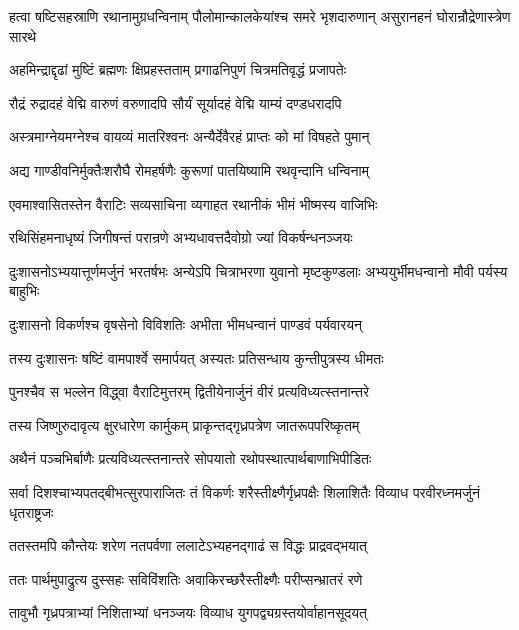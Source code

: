 \threelineshloka
{हत्वा षष्टिसहस्राणि रथानामुग्रधन्विनाम्}
{पौलोमान्कालकेयांश्च समरे भृशदारुणान्}
{असुरानहनं घोरान्रौद्रेणास्त्रेण सारथे}


\twolineshloka
{अहमिन्द्राद्दृढां मुष्टिं ब्रह्मणः क्षिप्रहस्तताम्}
{प्रगाढनिपुणं चित्रमतिवृद्धं प्रजापतेः}


\twolineshloka
{रौद्रं रुद्रादहं वेद्मि वारुणं वरुणादपि}
{सौर्यं सूर्यादहं वेद्मि याम्यं दण्डधरादपि}


\twolineshloka
{अस्त्रमाग्नेयमग्नेश्च वायव्यं मातरिश्वनः}
{अन्यैर्देवैरहं प्राप्तः को मां विषहते पुमान्}


\twolineshloka
{अद्य गाण्डीवनिर्मुक्तैःशरौघै रोमहर्षणैः}
{कुरूणां पातयिष्यामि रथवृन्दानि धन्विनाम्}



\twolineshloka
{एवमाश्वासितस्तेन वैराटिः सव्यसाचिना}
{व्यगाहत रथानीकं भीमं भीष्मस्य वाजिभिः}


\twolineshloka
{रथिसिंहमनाधृष्यं जिगीषन्तं परान्रणे}
{अभ्यधावत्तदैवोग्रो ज्यां विकर्षन्धनञ्जयः}


\onelineshloka
{दुःशासनोऽभ्ययात्तूर्णमर्जुनं भरतर्षभः}
\twolineshloka
{अन्येऽपि चित्राभरणा युवानो मृष्टकुण्डलाः}
{अभ्ययुर्भीमधन्वानो मौवी पर्यस्य बाहुभिः}


\twolineshloka
{दुःशासनो विकर्णश्च वृषसेनो विविशतिः}
{अभीता भीमधन्वानं पाण्डवं पर्यवारयन्}


\twolineshloka
{तस्य दुःशासनः षष्टिं वामपार्श्वे समार्पयत्}
{अस्यतः प्रतिसन्धाय कुन्तीपुत्रस्य धीमतः}


\twolineshloka
{पुनश्चैव स भल्लेन विद्ध्वा वैराटिमुत्तरम्}
{द्वितीयेनार्जुनं वीरं प्रत्यविध्यत्स्तनान्तरे}


\twolineshloka
{तस्य जिष्णुरुदावृत्य क्षुरधारेण कार्मुकम्}
{प्राकृन्तद्गृध्रपत्रेण जातरूपपरिष्कृतम्}


\twolineshloka
{अथैनं पञ्चभिर्बाणैः प्रत्यविध्यत्स्तनान्तरे}
{सोपयातो रथोपस्थात्पार्थबाणाभिपीडितः}


\threelineshloka
{सर्वा दिशश्चाभ्यपतद्बीभत्सुरपाराजितः}
{तं विकर्णः शरैस्तीक्ष्णैर्गृध्रपक्षैः शिलाशितैः}
{विव्याध परवीरध्नमर्जुनं धृतराष्ट्रजः}


\twolineshloka
{ततस्तमपि कौन्तेयः शरेण नतपर्वणा}
{ललाटेऽभ्यहनद्गाढं स विद्धः प्राद्रवद्भयात्}


\twolineshloka
{ततः पार्थमुपाद्रुत्य दुस्सहः सविविंशतिः}
{अवाकिरच्छरैस्तीक्ष्णैः परीप्सन्भ्रातरं रणे}


\twolineshloka
{तावुभौ गृध्रपत्राभ्यां निशिताभ्यां धनञ्जयः}
{विव्याध युगपद्व्यग्रस्तयोर्वाहानसूदयत्}


